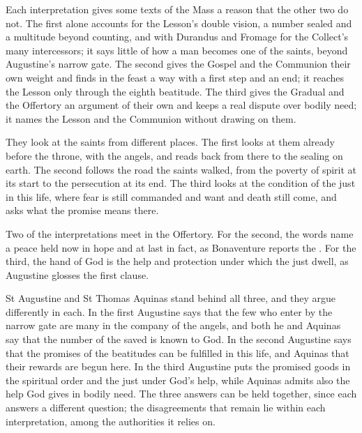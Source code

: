 Each interpretation gives some texts of the Mass a reason that the other two
do not. The first alone accounts for the Lesson's double vision, a number
sealed and a multitude beyond counting, and with Durandus and Fromage for the
Collect's many intercessors; it says little of how a man becomes one of the
saints, beyond Augustine's narrow gate. The second gives the Gospel and the
Communion their own weight and finds in the feast a way with a first step and
an end; it reaches the Lesson only through the eighth beatitude. The third
gives the Gradual and the Offertory an argument of their own and keeps a real
dispute over bodily need; it names the Lesson and the Communion without
drawing on them.

They look at the saints from different places. The first looks at them
already before the throne, with the angels, and reads back from there to the
sealing on earth. The second follows the road the saints walked, from the
poverty of spirit at its start to the persecution at its end. The third looks
at the condition of the just in this life, where fear is still commanded and
want and death still come, and asks what the promise means there.

Two of the interpretations meet in the Offertory. For the second, the words
 name a peace held now in hope and at last in
fact, as Bonaventure reports the . For the third, the hand of
God is the help and protection under which the just dwell, as Augustine
glosses the first clause.

St Augustine and St Thomas Aquinas stand behind all three, and they argue
differently in each. In the first Augustine says that the few who enter by
the narrow gate are many in the company of the angels, and both he and Aquinas
say that the number of the saved is known to God. In the second Augustine
says that the promises of the beatitudes can be fulfilled in this life, and
Aquinas that their rewards are begun here. In the third Augustine puts the
promised goods in the spiritual order and the just under God's help, while
Aquinas admits also the help God gives in bodily need. The three answers can
be held together, since each answers a different question; the disagreements
that remain lie within each interpretation, among the authorities it relies
on.
